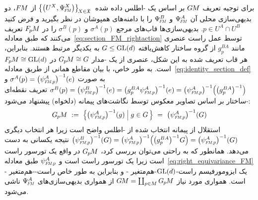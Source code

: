 برای توجیه تعریف $G\mkern-1.4muM$ بر اساس یک -اطلس داده شده $\big\{ \big(U^X, \PsiFM^X \big) \big\}_{\!X\in\mathfrak{X}}\,$ از $F\mkern-1.5muM$، دو بدیهی‌سازی محلی آن $\PsiFM^A$ و $\PsiFM^B$ را با دامنه‌های همپوشان در نظر بگیرید و فرض کنید $p \in U^A\cap U^B$.
بدیهی‌سازی‌ها قاب‌های مرجع $\sigma^A(p)$ و $\sigma^B(p)$ را در $F_{\mkern-1.5mu p}\mkern-1.0muM$ تعریف می‌کنند که طبق معادله~\eqref{eq:section_FM_rightaction} توسط عمل راست عنصری مانند $g_p^{BA}$ از گروه ساختار کاهش‌یافته $G \leq \operatorname{GL}(d)$ به یکدیگر مرتبط هستند.
بنابراین، هر قاب تعریف شده به این شکل، عنصری از یک -مدار $G_{\mkern-1.3mu p}\mkern-1.2muM \cong G$ در $F_{\mkern-1.5mu p}\mkern-1.0muM \cong \operatorname{GL}(d)$ است.
به طور خاص، با بیان مقاطع همانی از طریق معادله~\eqref{eq:identity_section_def} به صورت $\sigma^A(p) = \big( \psiFMp^A \big)^{-1} (e)$ و
$
\sigma^B(p)
= \big( \psiFMp^B \big)^{-1} (e)
= \big( g_p^{BA} \psiFMp^A \big)^{-1} (e)
= \big( \psiFMp^A \big)^{-1} \pig( \big( g_p^{BA} \big)^{-1} \pig)
$
تعریف نقطه‌ای -ساختار بر اساس تصاویر معکوس  توسط نگاشت‌های پیمانه (دلخواه) پیشنهاد می‌شود:
\begin{align}\label{eq:G_atlas_induced_G_structure_GM_def_ptwise}
	\GpM\ :=\ \pig\{ \big(\psiFMp^A \big)^{-1}(g) \;\pig|\; g\in G\, \pig\} \ =\ \big( \psiFMp^A \big)^{-1} (G)
\end{align}
استقلال از پیمانه انتخاب شده از -اطلس واضح است زیرا هر انتخاب دیگری
$
\big( \psiFMp^B \big)^{-1} (G)
= \big( \psiFMp^A \big)^{-1} \pig( \big(g_p^{BA}\big)^{-1} G \pig)
= \big( \psiFMp^A \big)^{-1} (G)
$
نتیجه یکسانی به دست می‌دهد.
همانطور که به راحتی می‌توان بررسی کرد، $G_{\mkern-1.3mu p}\mkern-1.2muM$ در واقع یک تورسور راست  است زیرا  یک تورسور راست  است و $\psiFMp^A$ طبق معادله~\eqref{eq:right_equivariance_FM} یک ایزومورفیسم راست-$\operatorname{GL}(d)$-هم‌متغیر - و بنابراین به طور خاص راست--هم‌متغیر - است.
همواری مورد نیاز $G\mkern-1.4muM = \coprod_{p\in M} G_{\mkern-1.3mu p}\mkern-1.2muM$ از همواری بدیهی‌سازی‌های $\PsiFM^A$ ناشی می‌شود.

